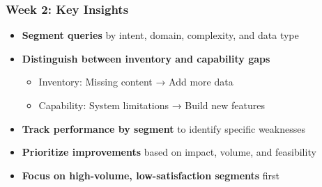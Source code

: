 \begin{frame}
    \frametitle{Week 2: Key Insights}
    
    \begin{center}
    \end{center}
    
    \begin{itemize}
        \item \textbf{Segment queries} by intent, domain, complexity, and data type
        \item \textbf{Distinguish between inventory and capability gaps}
            \begin{itemize}
                \item Inventory: Missing content → Add more data
                \item Capability: System limitations → Build new features
            \end{itemize}
        \item \textbf{Track performance by segment} to identify specific weaknesses
        \item \textbf{Prioritize improvements} based on impact, volume, and feasibility
        \item \textbf{Focus on high-volume, low-satisfaction segments} first
    \end{itemize}
    
    \begin{center}
    \end{center}
\end{frame}


